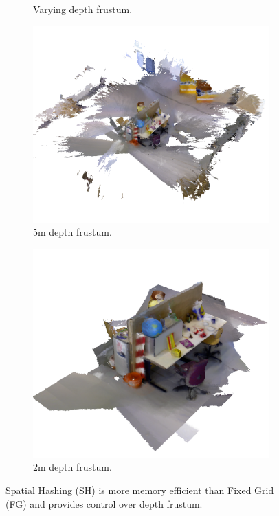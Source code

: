 \documentclass[conference]{IEEEtran}
\begin{document}
\begin{figure}[t!]
\begin{subfigure}[b]{0.22\linewidth}
			 \caption{Varying depth frustum.} 
			 \label{fig:memory_data2}
		 \end{subfigure}
	  \begin{subfigure}[b]{0.27\linewidth} \centering 
		\includegraphics[width=1.0\textwidth]{img/freiburg_5m.png}
		 \caption{5m depth frustum.}
		 \label{fig:freiburg_5m}
	 	\end{subfigure} 
 		\begin{subfigure}[b]{0.27\linewidth} \centering
		\includegraphics[width=1.0\textwidth]{img/freiburg_2m.png}
		 \caption{2m depth frustum.} 
		 \label{fig:freiburg_2m}
	 \end{subfigure}
	 \caption{Spatial Hashing (SH) is more memory efficient than Fixed Grid (FG) and provides control over depth frustum.}
\end{figure} 
\end{document}
